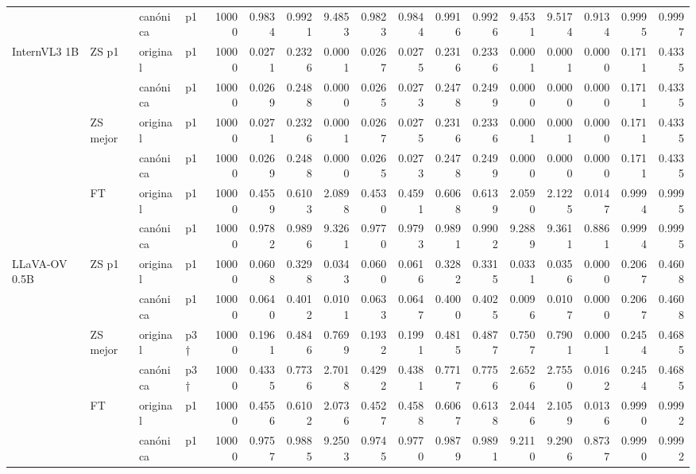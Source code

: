\begin{tabular}{llllrrrrrrrrrrrrr}
 &  & canónica & p1 & 10000 & 0.9834 & 0.9921 & 9.4853 & 0.9823 & 0.9844 & 0.9916 & 0.9926 & 9.4531 & 9.5174 & 0.9134 & 0.9995 & 0.9997 \\
\cline{1-17} \cline{2-17}
\multirow[t]{6}{*}{InternVL3 1B} & \multirow[t]{2}{*}{ZS p1} & original & p1 & 10000 & 0.0271 & 0.2326 & 0.0001 & 0.0267 & 0.0275 & 0.2316 & 0.2336 & 0.0001 & 0.0001 & 0.0000 & 0.1711 & 0.4335 \\
 &  & canónica & p1 & 10000 & 0.0269 & 0.2488 & 0.0000 & 0.0265 & 0.0273 & 0.2478 & 0.2499 & 0.0000 & 0.0000 & 0.0000 & 0.1711 & 0.4335 \\
\cline{2-17}
 & \multirow[t]{2}{*}{ZS mejor} & original & p1 & 10000 & 0.0271 & 0.2326 & 0.0001 & 0.0267 & 0.0275 & 0.2316 & 0.2336 & 0.0001 & 0.0001 & 0.0000 & 0.1711 & 0.4335 \\
 &  & canónica & p1 & 10000 & 0.0269 & 0.2488 & 0.0000 & 0.0265 & 0.0273 & 0.2478 & 0.2499 & 0.0000 & 0.0000 & 0.0000 & 0.1711 & 0.4335 \\
\cline{2-17}
 & \multirow[t]{2}{*}{FT} & original & p1 & 10000 & 0.4559 & 0.6103 & 2.0898 & 0.4530 & 0.4591 & 0.6068 & 0.6139 & 2.0590 & 2.1225 & 0.0147 & 0.9994 & 0.9995 \\
 &  & canónica & p1 & 10000 & 0.9782 & 0.9896 & 9.3261 & 0.9770 & 0.9793 & 0.9891 & 0.9902 & 9.2889 & 9.3611 & 0.8861 & 0.9994 & 0.9995 \\
\cline{1-17} \cline{2-17}
\multirow[t]{6}{*}{LLaVA-OV 0.5B} & \multirow[t]{2}{*}{ZS p1} & original & p1 & 10000 & 0.0608 & 0.3298 & 0.0343 & 0.0600 & 0.0616 & 0.3282 & 0.3315 & 0.0331 & 0.0356 & 0.0000 & 0.2067 & 0.4608 \\
 &  & canónica & p1 & 10000 & 0.0640 & 0.4012 & 0.0101 & 0.0633 & 0.0647 & 0.4000 & 0.4025 & 0.0096 & 0.0107 & 0.0000 & 0.2067 & 0.4608 \\
\cline{2-17}
 & \multirow[t]{2}{*}{ZS mejor} & original & p3 † & 10000 & 0.1961 & 0.4846 & 0.7699 & 0.1932 & 0.1991 & 0.4815 & 0.4877 & 0.7507 & 0.7901 & 0.0001 & 0.2454 & 0.4685 \\
 &  & canónica & p3 † & 10000 & 0.4335 & 0.7736 & 2.7018 & 0.4292 & 0.4381 & 0.7717 & 0.7756 & 2.6526 & 2.7550 & 0.0162 & 0.2454 & 0.4685 \\
\cline{2-17}
 & \multirow[t]{2}{*}{FT} & original & p1 & 10000 & 0.4556 & 0.6102 & 2.0736 & 0.4527 & 0.4588 & 0.6067 & 0.6138 & 2.0446 & 2.1059 & 0.0136 & 0.9990 & 0.9992 \\
 &  & canónica & p1 & 10000 & 0.9757 & 0.9885 & 9.2503 & 0.9745 & 0.9770 & 0.9879 & 0.9891 & 9.2110 & 9.2906 & 0.8737 & 0.9990 & 0.9992 \\

\end{tabular}
